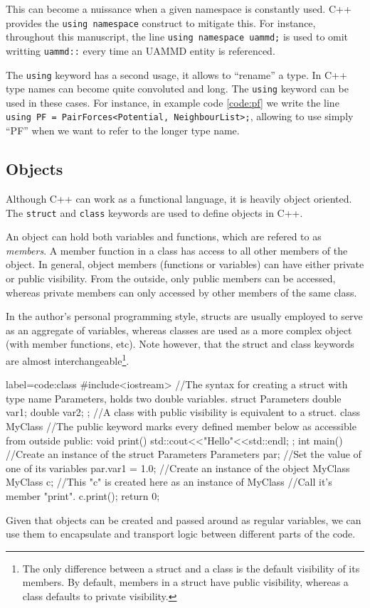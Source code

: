 \documentclass[ twoside,openright,titlepage,numbers=noenddot,%
headinclude,footinclude,cleardoublepage=empty,abstract=on,
BCOR=5mm,paper=a4,fontsize=11pt, dvipsnames
]{scrreprt}
\def\ucpp{uammd_cpp_lexer.py:UAMMDCppLexer -x}
\newcommand{\uammd}{\gls{UAMMD}\xspace}
\begin{document}
This can become a nuissance when a given namespace is constantly used. C++ provides the \texttt{using namespace} construct to mitigate this. For instance, throughout this manuscript, the line \texttt{using namespace uammd;} is used to omit writting \texttt{uammd::} every time an \uammd entity is referenced.

The \texttt{using} keyword has a second usage, it allows to ``rename'' a type. In C++ type names can become quite convoluted and long. The \texttt{using} keyword can be used in these cases. For instance, in example code \ref{code:pf} we write the line \texttt{using PF = PairForces<Potential, NeighbourList>;}, allowing to use simply ``PF'' when we want to refer to the longer type name.
\subsection*{Objects}
Although C++ can work as a functional language, it is heavily object oriented. The \texttt{struct} and \texttt{class} keywords are used to define objects in C++.

An object can hold both variables and functions, which are refered to as \emph{members}. A member function in a class has access to all other members of the object. In general, object members (functions or variables) can have either private or public visibility. From the outside, only public members can be accessed, whereas private members can only accessed by other members of the same class.

In the author's personal programming style, structs are usually employed to serve as an aggregate of variables, whereas classes are used as a more complex object (with member functions, etc). Note however, that the struct and class keywords are almost interchangeable\footnote{The only difference between a struct and a class is the default visibility of its members. By default, members in a struct have public visibility, whereas a class defaults to private visibility.}.

\begin{code2} {label=code:class}
  #include<iostream>
  //The syntax for creating a struct with type name Parameters, holds two double variables.
  struct Parameters{
    double var1;
    double var2;    
  };
  //A class with public visibility is equivalent to a struct.
  class MyClass{
    //The public keyword marks every defined member below as accessible from outside
    public:
    void print(){
      std::cout<<"Hello"<<std::endl;
    }
  };
  int main(){
    //Create an instance of the struct Parameters
    Parameters par;
    //Set the value of one of its variables
    par.var1 = 1.0;
    //Create an instance of the object MyClass
    MyClass c;
    //This "c" is created here as an instance of MyClass
    //Call it's member "print".
    c.print();
    return 0;  
  }
\end{code2}
Given that objects can be created and passed around as regular variables, we can use them to encapsulate and transport logic between different parts of the code.
\end{document}
